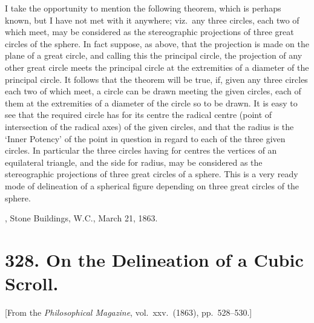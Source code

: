 \documentclass[11pt,a4paper]{article}
\theoremstyle{plain}
\begin{document}
I take the opportunity to mention the following theorem, which is perhaps known, but I have not met with it anywhere; viz.\ any three circles, each two of which meet,
\newpage
may be considered as the stereographic projections of three great circles of the sphere. In fact suppose, as above, that the projection is made on the plane of a great circle, and calling this the principal circle, the projection of any other great circle meets the principal circle at the extremities of a diameter of the principal circle. It follows that the theorem will be true, if, given any three circles each two of which meet, a circle can be drawn meeting the given circles, each of them at the extremities of a diameter of the circle so to be drawn. It is easy to see that the required circle has for its centre the radical centre (point of intersection of the radical axes) of the given circles, and that the radius is the `Inner Potency' of the point in question in regard to each of the three given circles. In particular the three circles having for centres the vertices of an equilateral triangle, and the side for radius, may be considered as the stereographic projections of three great circles of a sphere. This is a very ready mode of delineation of a spherical figure depending on three great circles of the sphere.

\medskip
{}, Stone Buildings, W.C., March 21, 1863.


\newpage
\section*{328. On the Delineation of a Cubic Scroll.}

[From the \textit{Philosophical Magazine}, vol.\ xxv.\ (1863), pp.\ 528--530.]

\medskip
\end{document}
